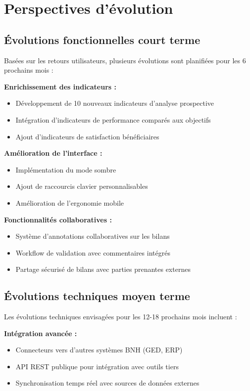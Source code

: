 \section{Perspectives d'évolution}

\subsection{Évolutions fonctionnelles court terme}

Basées sur les retours utilisateurs, plusieurs évolutions sont planifiées pour les 6 prochains mois :

\medskip

\textbf{Enrichissement des indicateurs :}
\begin{itemize}
    \item Développement de 10 nouveaux indicateurs d'analyse prospective
    \item Intégration d'indicateurs de performance comparés aux objectifs
    \item Ajout d'indicateurs de satisfaction bénéficiaires
\end{itemize}

\textbf{Amélioration de l'interface :}
\begin{itemize}
    \item Implémentation du mode sombre
    \item Ajout de raccourcis clavier personnalisables
    \item Amélioration de l'ergonomie mobile
\end{itemize}

\textbf{Fonctionnalités collaboratives :}
\begin{itemize}
    \item Système d'annotations collaboratives sur les bilans
    \item Workflow de validation avec commentaires intégrés
    \item Partage sécurisé de bilans avec parties prenantes externes
\end{itemize}

\subsection{Évolutions techniques moyen terme}

Les évolutions techniques envisagées pour les 12-18 prochains mois incluent :

\medskip

\textbf{Intégration avancée :}
\begin{itemize}
    \item Connecteurs vers d'autres systèmes BNH (GED, ERP)
    \item API REST publique pour intégration avec outils tiers
    \item Synchronisation temps réel avec sources de données externes
\end{itemize}

